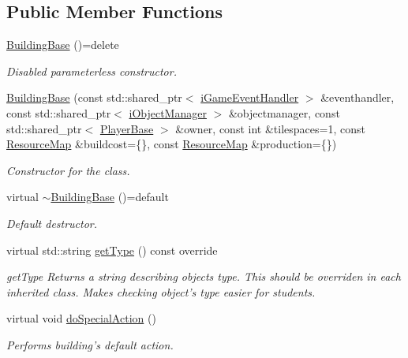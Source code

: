 \subsection*{Public Member Functions}
\begin{DoxyCompactItemize}
\item 
\hyperlink{classCourse_1_1BuildingBase_a899534ce249e7bd1c55883b7c0f4db93}{Building\-Base} ()=delete
\begin{DoxyCompactList}\small\item\em Disabled parameterless constructor. \end{DoxyCompactList}\item 
\hyperlink{classCourse_1_1BuildingBase_a2aefafd40f901b002c09c2561fe4327c}{Building\-Base} (const std\-::shared\-\_\-ptr$<$ \hyperlink{classCourse_1_1iGameEventHandler}{i\-Game\-Event\-Handler} $>$ \&eventhandler, const std\-::shared\-\_\-ptr$<$ \hyperlink{classCourse_1_1iObjectManager}{i\-Object\-Manager} $>$ \&objectmanager, const std\-::shared\-\_\-ptr$<$ \hyperlink{classCourse_1_1PlayerBase}{Player\-Base} $>$ \&owner, const int \&tilespaces=1, const \hyperlink{namespaceCourse_ab9a46ed9cd00485e318e5731ea2f78d9}{Resource\-Map} \&buildcost=\{\}, const \hyperlink{namespaceCourse_ab9a46ed9cd00485e318e5731ea2f78d9}{Resource\-Map} \&production=\{\})
\begin{DoxyCompactList}\small\item\em Constructor for the class. \end{DoxyCompactList}\item 
virtual \hyperlink{classCourse_1_1BuildingBase_aa1787cfb58ab07902c29fe02941dced6}{$\sim$\-Building\-Base} ()=default
\begin{DoxyCompactList}\small\item\em Default destructor. \end{DoxyCompactList}\item 
virtual std\-::string \hyperlink{classCourse_1_1BuildingBase_ac2cc44e08dc73d05b1617bf71295baaf}{get\-Type} () const override
\begin{DoxyCompactList}\small\item\em get\-Type Returns a string describing objects type. This should be overriden in each inherited class. Makes checking object's type easier for students. \end{DoxyCompactList}\item 
virtual void \hyperlink{classCourse_1_1BuildingBase_aa7363afb8cb5163db548e982bb3e9934}{do\-Special\-Action} ()
\begin{DoxyCompactList}\small\item\em Performs building's default action. \end{DoxyCompactList}\item 

\end{DoxyCompactItemize}
